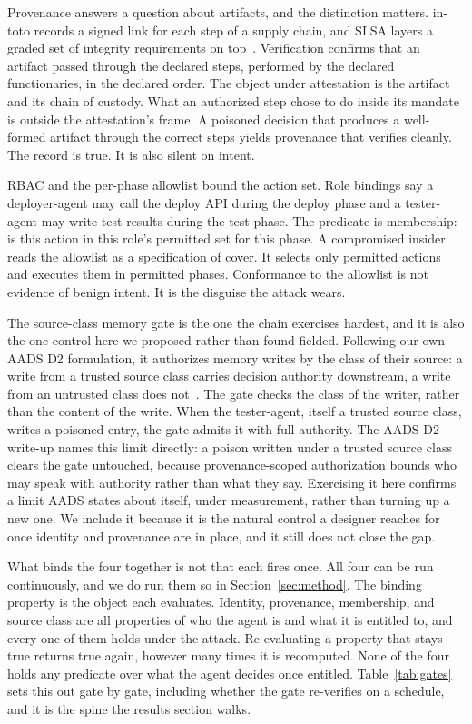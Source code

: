 \documentclass[conference]{IEEEtran}
\begin{document}
Provenance answers a question about artifacts, and the distinction matters. in-toto records a signed link for each step of a supply chain, and SLSA layers a graded set of integrity requirements on top~\cite{intoto,slsa}. Verification confirms that an artifact passed through the declared steps, performed by the declared functionaries, in the declared order. The object under attestation is the artifact and its chain of custody. What an authorized step chose to do inside its mandate is outside the attestation's frame. A poisoned decision that produces a well-formed artifact through the correct steps yields provenance that verifies cleanly. The record is true. It is also silent on intent.

RBAC and the per-phase allowlist bound the action set. Role bindings say a deployer-agent may call the deploy API during the deploy phase and a tester-agent may write test results during the test phase. The predicate is membership: is this action in this role's permitted set for this phase. A compromised insider reads the allowlist as a specification of cover. It selects only permitted actions and executes them in permitted phases. Conformance to the allowlist is not evidence of benign intent. It is the disguise the attack wears.

The source-class memory gate is the one the chain exercises hardest, and it is also the one control here we proposed rather than found fielded. Following our own AADS D2 formulation, it authorizes memory writes by the class of their source: a write from a trusted source class carries decision authority downstream, a write from an untrusted class does not~\cite{aads}. The gate checks the class of the writer, rather than the content of the write. When the tester-agent, itself a trusted source class, writes a poisoned entry, the gate admits it with full authority. The AADS D2 write-up names this limit directly: a poison written under a trusted source class clears the gate untouched, because provenance-scoped authorization bounds who may speak with authority rather than what they say. Exercising it here confirms a limit AADS states about itself, under measurement, rather than turning up a new one. We include it because it is the natural control a designer reaches for once identity and provenance are in place, and it still does not close the gap.

What binds the four together is not that each fires once. All four can be run continuously, and we do run them so in Section~\ref{sec:method}. The binding property is the object each evaluates. Identity, provenance, membership, and source class are all properties of who the agent is and what it is entitled to, and every one of them holds under the attack. Re-evaluating a property that stays true returns true again, however many times it is recomputed. None of the four holds any predicate over what the agent decides once entitled. Table~\ref{tab:gates} sets this out gate by gate, including whether the gate re-verifies on a schedule, and it is the spine the results section walks.
\end{document}
